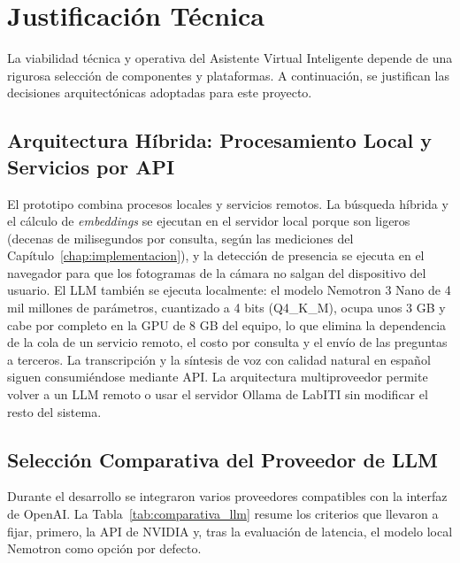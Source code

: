 \section{Justificación Técnica}
La viabilidad técnica y operativa del Asistente Virtual Inteligente depende de una rigurosa selección de componentes y plataformas. A continuación, se justifican las decisiones arquitectónicas adoptadas para este proyecto.

\subsection{Arquitectura Híbrida: Procesamiento Local y Servicios por API}
El prototipo combina procesos locales y servicios remotos. La búsqueda híbrida y el cálculo de \textit{embeddings} se ejecutan en el servidor local porque son ligeros (decenas de milisegundos por consulta, según las mediciones del Capítulo~\ref{chap:implementacion}), y la detección de presencia se ejecuta en el navegador para que los fotogramas de la cámara no salgan del dispositivo del usuario. El LLM también se ejecuta localmente: el modelo Nemotron 3 Nano de 4 mil millones de parámetros, cuantizado a 4 bits (Q4\_K\_M), ocupa unos 3 GB y cabe por completo en la GPU de 8 GB del equipo, lo que elimina la dependencia de la cola de un servicio remoto, el costo por consulta y el envío de las preguntas a terceros. La transcripción y la síntesis de voz con calidad natural en español siguen consumiéndose mediante API. La arquitectura multiproveedor permite volver a un LLM remoto o usar el servidor Ollama de LabITI sin modificar el resto del sistema.

\subsection{Selección Comparativa del Proveedor de LLM}
Durante el desarrollo se integraron varios proveedores compatibles con la interfaz de OpenAI. La Tabla~\ref{tab:comparativa_llm} resume los criterios que llevaron a fijar, primero, la API de NVIDIA y, tras la evaluación de latencia, el modelo local Nemotron como opción por defecto.

